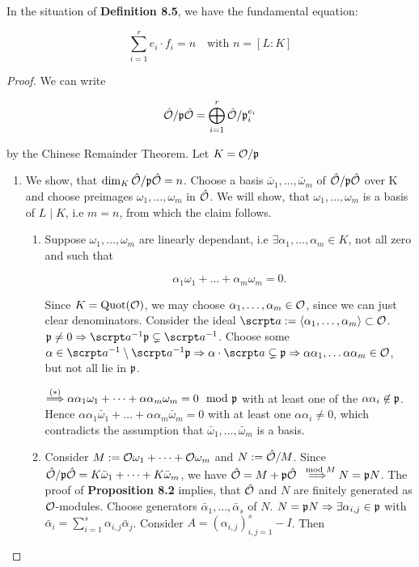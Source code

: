 \begin{Satz}
	In the situation of \textbf{Definition 8.5}, we have the fundamental equation:
	
	\[ \sum_{i=1}^r e_i \cdot f_i = n \quad \text{with } n = \left[ L:K\right]     \]
\end{Satz}
\begin{proof}
	We can write
	
	\[ \hat{\mathcal{O}} / \mathfrak{p}\hat{\mathcal{O}} = \bigoplus_{i=1}^r	\hat{\mathcal{O}} / \mathfrak{p}_i^{e_i}	\]
	
	by the Chinese Remainder Theorem. Let $K = \mathcal{O} / \mathfrak{p}$
	
	\begin{enumerate}[Step 1:]
		\item We show, that $\dim_K \hat{\mathcal{O}}/\mathfrak{p}\hat{\mathcal{O}} = n$. Choose a basis $\bar\omega_1, \dots, \bar\omega_m$ of $\hat{\mathcal{O}}/\mathfrak{p}\hat{\mathcal{O}}$ over K and choose preimages $\omega_1, \dots, \omega_m$ in $\hat{\mathcal{O}}$. We will show, that $\omega_1, \dots, \omega_m$ is a basis of $L \mid K$, i.e $m = n$, from which the claim follows.
		
		\begin{enumerate}[(1)]
			\item Suppose $\omega_1, \dots, \omega_m$ are linearly dependant, i.e $\exists \alpha_1, \dots, \alpha_m \in K$, not all zero and such that
			 
			 \[  \alpha_1\omega_1 + \dots + \alpha_m\omega_m = 0. \tag{$\ast$}     \]
			 
			 Since $K = \operatorname{Quot}(\mathcal{O})$, we may choose $\alpha_1, \dots, \alpha_m \in \mathcal{O}$, since we can just clear denominators. Consider the ideal $\a := \left\langle \alpha_1, \dots, \alpha_m \right\rangle \subset \O$. $\p \neq 0 \Rightarrow \a^{-1}\p \subsetneq \a^{-1}$. Choose some $\alpha \in \a^{-1} \setminus \a^{-1}\p \Rightarrow \alpha \cdot \a \subsetneq \p \Rightarrow \alpha\alpha_1, \dots \alpha\alpha_m \in \O$, but not all lie in $\mathfrak{p}$.
			 
			 $\overset{(\ast)}{\Longrightarrow} \alpha\alpha_1\omega_1 + \dots + \alpha\alpha_m\omega_m = 0 \mod {\mathfrak{p}}$ with at least one of the $\alpha\alpha_i \not\in \mathfrak{p}$. Hence $\alpha\alpha_1\bar\omega_1 + \dots + \alpha\alpha_m\bar\omega_m = 0$ with at least one $\alpha\alpha_i \neq 0$, which contradicts the assumption that $\bar\omega_1, \dots, \bar\omega_m$ is a basis.
			 
			 \item Consider $M := \mathcal{O}\omega_1 + \dots + \mathcal{O}\omega_m$ and $N:= \hat{\mathcal{O}}/M$. Since $\hat{\mathcal{O}}/\mathfrak{p}\hat{\mathcal{O}} = K\bar\omega_1 + \dots + K\bar\omega_m$, we have $\hat{\mathcal{O}} = M + \mathfrak{p}\hat{\mathcal{O}} \overset{\mod M}{\Longrightarrow} N = \mathfrak{p} N$. The proof of \textbf{Proposition 8.2} implies, that $\hat{\mathcal{O}}$ and $N$ are finitely generated as $\mathcal{O}$-modules. Choose generators $\bar\alpha_1, \dots, \bar\alpha_s$ of $N$. $N = \mathfrak{p} N \Rightarrow \exists \alpha_{i,j} \in \mathfrak{p}$ with $\bar\alpha_i = \sum_{i=1}^s \alpha_{i,j}\bar\alpha_j$. Consider $A = (\alpha_{i,j})_{i,j=1}^s - I$. Then
			 

\end{enumerate}
\end{enumerate}
\end{proof}

